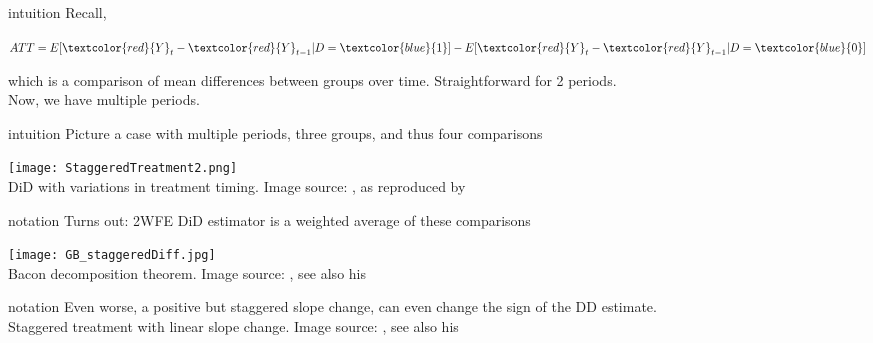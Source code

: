 \documentclass[aspectratio=169]{beamer}
\begin{document}
		\begin{frame}{intuition}
			Recall,
			\\ \vspace*{.25cm}
			\begin{center}
				\begin{math}
					ATT=E[\textcolor{red}{Y}_t - \textcolor{red}{Y}_{t-1}|D=\textcolor{blue}{1}] - E[\textcolor{red}{Y}_t-\textcolor{red}{Y}_{t-1}|D=\textcolor{blue}{0}]
				\end{math}
			\end{center}
			which is a comparison of mean differences between groups over time. Straightforward for 2 periods.
			\\ \vspace*{.25cm}
			Now, we have multiple periods.
		\end{frame}

		\begin{frame}{intuition}
			Picture a case with multiple periods, three groups, and thus four comparisons
			\begin{center}
				\texttt{[image: StaggeredTreatment2.png]}
				\\ \tiny{DiD with variations in treatment timing. Image source: \cite{Goodman-Bacon2021}, as reproduced by \href{https://andrewcbaker.netlify.app/2019/09/25/difference-in-differences-methodology/}{\underline{}}}
			\end{center}
		\end{frame}

		\begin{frame}{notation}
			Turns out: 2WFE DiD estimator is a weighted average of these comparisons
			\begin{center}
				\texttt{[image: GB\_staggeredDiff.jpg]}
				\\ \tiny{Bacon decomposition theorem. Image source: \cite{Goodman-Bacon2021}, see also his  \href{https://twitter.com/agoodmanbacon/status/1039126592604303360}{\underline{}}}
			\end{center}
		\end{frame}

			\begin{frame}{notation}
				Even worse, a positive but staggered slope change, can even change the sign of the DD estimate. \\
				\centering 
					\newline \tiny{Staggered treatment with linear slope change. Image source: \cite{Goodman-Bacon2021}, see also his  \href{https://twitter.com/agoodmanbacon/status/1039126592604303360}{\underline{}}}
			\end{frame}
\end{document}
